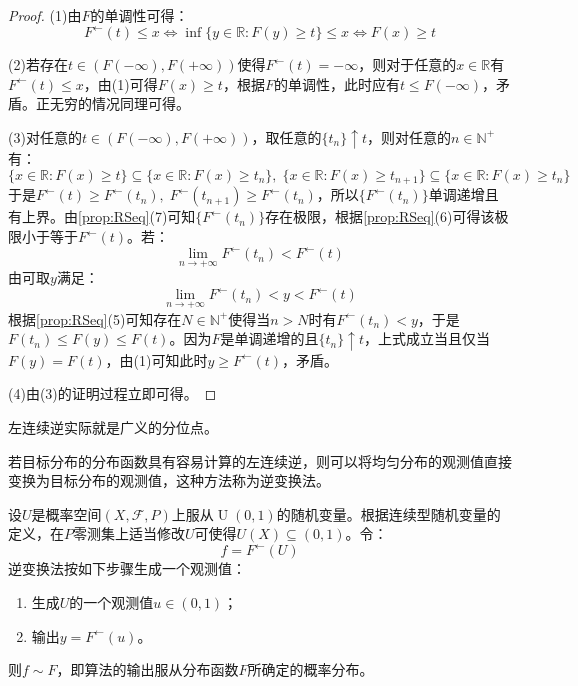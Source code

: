\begin{proof}
	(1)由$F$的单调性可得：
	\begin{equation*}
		F^{\leftarrow}(t)\leqslant x\Leftrightarrow\inf\{y\in\mathbb{R}:F(y)\geqslant t\}\leqslant x\Leftrightarrow F(x)\geqslant t
	\end{equation*}\par
	(2)若存在$t\in(F(-\infty),F(+\infty))$使得$F^{\leftarrow}(t)=-\infty$，则对于任意的$x\in\mathbb{R}$有$F^{\leftarrow}(t)\leqslant x$，由(1)可得$F(x)\geqslant t$，根据$F$的单调性，此时应有$t\leqslant F(-\infty)$，矛盾。正无穷的情况同理可得。\par
	(3)对任意的$t\in(F(-\infty),F(+\infty))$，取任意的$\{t_n\}\uparrow t$，则对任意的$n\in\mathbb{N}^+$有：
	\begin{equation*}
		\{x\in\mathbb{R}:F(x)\geqslant t\}\subseteq\{x\in\mathbb{R}:F(x)\geqslant t_n\},\;\{x\in\mathbb{R}:F(x)\geqslant t_{n+1}\}\subseteq\{x\in\mathbb{R}:F(x)\geqslant t_n\}
	\end{equation*}
	于是$F^{\leftarrow}(t)\geqslant F^{\leftarrow}(t_n),\;F^{\leftarrow}(t_{n+1})\geqslant F^{\leftarrow}(t_n)$，所以$\{F^{\leftarrow}(t_n)\}$单调递增且有上界。由\cref{prop:RSeq}(7)可知$\{F^{\leftarrow}(t_n)\}$存在极限，根据\cref{prop:RSeq}(6)可得该极限小于等于$F^{\leftarrow}(t)$。若：
	\begin{equation*}
		\lim_{n\to+\infty}F^{\leftarrow}(t_n)<F^{\leftarrow}(t)
	\end{equation*}
	由可取$y$满足：
	\begin{equation*}
		\lim_{n\to+\infty}F^{\leftarrow}(t_n)<y<F^{\leftarrow}(t)
	\end{equation*}
	根据\cref{prop:RSeq}(5)可知存在$N\in\mathbb{N}^+$使得当$n>N$时有$F^{\leftarrow}(t_n)<y$，于是$F(t_n)\leqslant F(y)\leqslant F(t)$。因为$F$是单调递增的且$\{t_n\}\uparrow t$，上式成立当且仅当$F(y)=F(t)$，由(1)可知此时$y\geqslant F^{\leftarrow}(t)$，矛盾。\par
	(4)由(3)的证明过程立即可得。
\end{proof}
\begin{note}
	左连续逆实际就是广义的分位点。
\end{note}
若目标分布的分布函数具有容易计算的左连续逆，则可以将均匀分布的观测值直接变换为目标分布的观测值，这种方法称为逆变换法。
\begin{method}
	设$U$是概率空间$(X,\mathscr{F},P)$上服从$\operatorname{U}(0,1)$的随机变量。根据连续型随机变量的定义，在$P$零测集上适当修改$U$可使得$U(X)\subseteq(0,1)$。令：
	\begin{equation*}
		f=F^{\leftarrow}(U)
	\end{equation*}
	逆变换法按如下步骤生成一个观测值：
	\begin{enumerate}
		\item 生成$U$的一个观测值$u\in(0,1)$；
		\item 输出$y=F^{\leftarrow}(u)$。
	\end{enumerate}
	则$f\sim F$，即算法的输出服从分布函数$F$所确定的概率分布。
\end{method}
